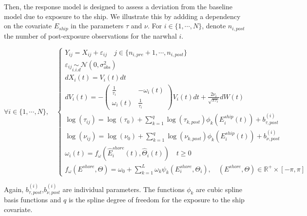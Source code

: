 \documentclass[11pt]{article}
\newcommand {\R}{\mathbb{R}}
\newcommand {\1}{\mathbb{1}}
\theoremstyle{definition}
\theoremstyle{remark}
\theoremstyle{remark}
\begin{document}
Then, the response model is designed to assess a deviation from the baseline model due to exposure to the ship. We illustrate this by addding a dependency on the covariate $E_{ship}$ in the parameters $\tau$ and $\nu$. 
For $i \in \{1, \cdots, N\}$, denote $n_{i,post}$ the number of post-exposure observations for the narwhal $i$.

\begin{equation}  \forall i \in \{1,\cdots,N\}, \quad \left\{
	\begin{array}{l}
		Y_{ij}=X_{ij}+\varepsilon_{ij} \quad j \in \{n_{i,pre}+1,\cdots,n_{i,post}\}\\
		\varepsilon_{ij} \underset{i.i.d}{\sim} \mathcal{N}(0,\sigma_{obs}^2)  \\
		dX_i(t)=V_i(t)dt  \\
		dV_i(t)=-\begin{pmatrix} 
			\frac{1}{\tau_i} & -\omega_i(t) \\
			\omega_i(t) & \frac{1}{\tau_i}
		\end{pmatrix}V_i(t)dt+\frac{2\nu_i}{\sqrt{\pi \tau_i}} dW(t) \\
		\log(\tau_{ij})=\log(\tau_{0}) +\sum_{k=1}^{q} \log(\tau_{k,post})\phi_{k}(E^{ship}_i(t))+b^{(i)}_{\tau,post} \\
		\log(\nu_{ij})=\log(\nu_{0}) +  \sum_{k=1}^{q} \log(\nu_{k,post}) \phi_{k}(E^{ship}_i(t)) +b^{(i)}_{\nu,post}  \\
		\omega_i(t)=f_{\omega}(\hat{E}^{shore}_i(t),\hat{\Theta}_i(t)) \quad t \geq 0\\
		f_{\omega}(E^{shore},\Theta)=\omega_{0}+\sum_{k=1}^{L} \omega_{k} \psi_k(E^{shore}_i,\Theta_i), \quad (E^{shore},\Theta) \in \R^+ \times [-\pi,\pi]
	\end{array}
	\right.
	\label{eq: exact response model}
\end{equation}


Again, $b^{(i)}_{\tau,post}$,$b^{(i)}_{\nu,post}$ are individual parameters. The functions $\phi_k$ are cubic spline basis functions and $q$ is the spline degree of freedom for the exposure to the ship covariate.
\end{document}
